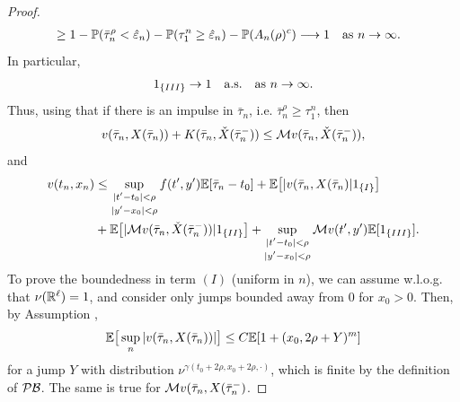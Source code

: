\begin{proof}
\begin{align*}
        & \geq 1 - \mathbb{P}(\bar \tau_n^\rho < \hat \varepsilon_n) - \mathbb{P}(\tau_1^n \geq \hat \varepsilon_n) - \mathbb{P}(A_n(\rho)^c) \longrightarrow 1 \quad \text{as } n \rightarrow \infty.
    \end{align*}
    In particular, 
    \begin{equation*}
        1_{\left\{III\right\}} \rightarrow 1 \quad \text{a.s.} \quad \text{as } n \rightarrow \infty. 
    \end{equation*}
    Thus, using that if there is an impulse in $\bar \tau_n$, i.e. $\bar \tau_n^\rho \geq \tau_1^n$, then
    \begin{equation*}
        v(\bar \tau_n, X(\bar \tau_n)) + K(\bar \tau_n, \check X(\bar \tau_n^-)) \leq \mathcal{M} v(\bar \tau_n, \check{X}(\bar \tau_n^-)),
    \end{equation*}
    and 
    \begin{align*}
        v(t_n,x_n) &\leq \sup_{\substack{|t' - t_0| < \rho \\[2pt] |y' - x_0| < \rho}} f(t', y') \mathbb{E}[\bar \tau_n - t_0] + \mathbb{E} \big[|v(\bar \tau_n, X(\bar \tau_n)| 1_{\left\{I\right\}} \big] \\
        & + \mathbb{E}\big[ |\mathcal{M} v(\bar \tau_n, \check{X}(\bar \tau_n^-))| 1_{\left\{II\right\}} \big] + \sup_{\substack{|t' - t_0| < \rho \\[2pt] |y' - x_0| < \rho}} \mathcal{M} v(t',y') \mathbb{E} [1_{\left\{III\right\}}]. 
        \label{eqn: Theorem 4.8, temporary result 5}
    \end{align*}
    To prove the boundedness in term $(I)$ (uniform in $n$), we can assume w.l.o.g. that $\nu(\mathbb{R}^\ell) = 1$, and consider only jumps bounded away from $0$ for $x_0>0$. Then, by Assumption ,
    \begin{equation*}
        \mathbb{E} \big[ \sup_n |v(\bar \tau_n, X(\bar \tau_n))| \big] \leq C \mathbb{E} [1+(x_0,2 \rho + Y)^m]
    \end{equation*}
    for a jump $Y$ with distribution $\nu^{\gamma(t_0 + 2\rho, x_0+2 \rho, \cdot)}$, which is finite by the definition of $\mathcal{PB}$. The same is true for $\mathcal{M} v(\bar \tau_n,X(\bar \tau_n^-)$. 


\end{proof}
